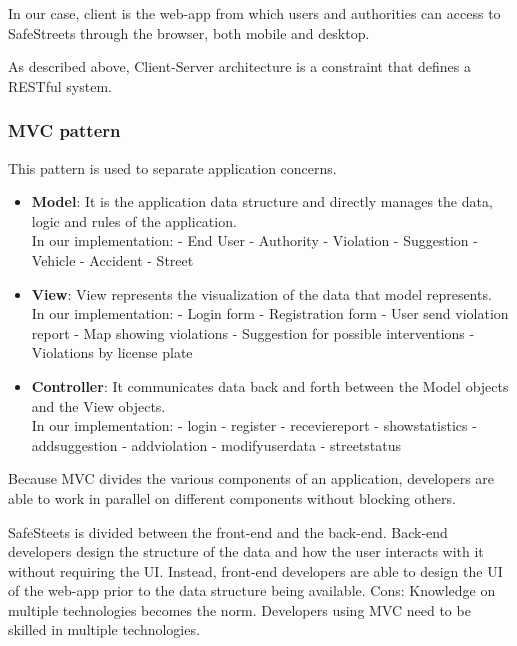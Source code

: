 In our case, client is the web-app from which users and authorities can access to SafeStreets through the browser, both mobile and desktop.

As described above, Client-Server architecture is a constraint that defines a RESTful system.

\subsubsection{MVC pattern}
This pattern is used to separate application concerns.
\begin{itemize}
	\item \textbf{Model}: It is the application data structure and directly manages the data, logic and rules of the application. \\
	In our implementation:
	\subitem - End User
	\subitem - Authority
	\subitem - Violation
	\subitem - Suggestion
	\subitem - Vehicle
	\subitem - Accident
	\subitem - Street
	
	\newpage
	
	\item \textbf{View}: View represents the visualization of the data that model represents. \\
	In our implementation:
	\subitem - Login form
	\subitem - Registration form
	\subitem - User send violation report
	\subitem - Map showing violations
	\subitem - Suggestion for possible interventions
	\subitem - Violations by license plate
	
	\item \textbf{Controller}: It communicates data back and forth between the Model objects and the View objects. \\
	In our implementation:
	\subitem - login
	\subitem - register
	\subitem - receviereport
	\subitem - showstatistics
	\subitem - addsuggestion
	\subitem - addviolation
	\subitem - modifyuserdata
	\subitem - streetstatus
\end{itemize}

Because MVC divides the various components of an application, developers are able to work in parallel on different components without blocking others. 

SafeSteets is divided between the front-end and the back-end. Back-end developers design the structure of the data and how the user interacts with it without requiring the UI. Instead, front-end developers are able to design the UI of the web-app prior to the data structure being available.
Cons: Knowledge on multiple technologies becomes the norm. Developers using MVC need to be skilled in multiple technologies.

